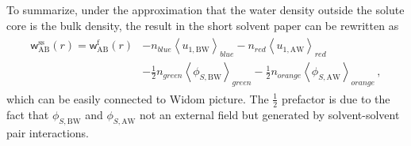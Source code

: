 \documentclass[9pt]{article}
\newcommand{\A}{\mathrm{A}}
\newcommand{\W}{\mathrm{W}}
\newcommand{\B}{\mathrm{B}}
\newcommand{\f}{\mathrm{f}}
\newcommand{\sss}{\mathrm{ss}}
\newcommand{\w}{\mathsf{w}}
\begin{document}
To summarize, under the approximation that the water density outside the solute core is the bulk density, the result in the short solvent paper can be rewritten as
 \begin{align}
\begin{split}
 \w_{\A\B}^{\sss}(r) =  \w_{\A\B}^{\f}(r)   & - n_{blue} \left\langle u_{1,\B\W} \right\rangle_{blue} - n_{red} \left\langle u_{1,\A\W} \right\rangle_{red} \\
  & - \frac{1}{2} n_{green}  \left\langle \phi_{S,\B\W} \right\rangle_{green} - \frac{1}{2} n_{orange}  \left\langle \phi_{S,\A\W} \right\rangle_{orange}  \,,
\end{split}
\label{eq:wss_finalfinalwidom}
\end{align}
which can be easily connected to Widom picture. The $\frac{1}{2}$ prefactor is due to the fact that $\phi_{S,\B\W} $ and $\phi_{S,\A\W}$ not an external field but  generated by solvent-solvent pair interactions. 
\end{document}
